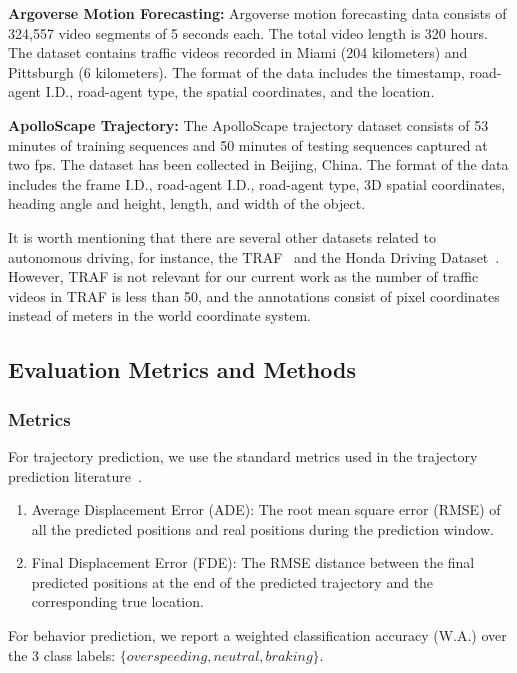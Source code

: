 \documentclass[10pt,twocolumn,letterpaper]{article}
\theoremstyle{plain}
\begin{document}
\noindent \textbf{Argoverse Motion Forecasting: } Argoverse motion forecasting data consists of 324,557 video segments of 5 seconds each. The total video length is 320 hours. The dataset contains traffic videos recorded in Miami (204 kilometers) and Pittsburgh (6 kilometers). The format of the data includes the timestamp, road-agent I.D., road-agent type, the spatial coordinates, and the location.

\noindent \textbf{ApolloScape Trajectory:} The ApolloScape trajectory dataset consists of 53 minutes of training sequences and 50 minutes of testing sequences captured at two fps. The dataset has been collected in Beijing, China. The format of the data includes the frame I.D., road-agent I.D., road-agent type, 3D spatial coordinates, heading angle and height, length, and width of the object.

It is worth mentioning that there are several other datasets related to autonomous driving, for instance, the TRAF~\cite{traphic} and the Honda Driving Dataset~\cite{honda}. However, TRAF is not relevant for our current work as the number of traffic videos in TRAF is less than 50, and the annotations consist of pixel coordinates instead of meters in the world coordinate system. 
\subsection{Evaluation Metrics and Methods}
\label{subsec: eval_metrics_methods}
\subsubsection{Metrics}
For trajectory prediction, we use the standard metrics used in the trajectory prediction literature~\cite{social-lstm,social-gan,traphic,nachiket,chandra2019robusttp}.
\begin{enumerate}[noitemsep]
    \item Average Displacement Error (ADE): The root mean square error (RMSE) of all the predicted positions and real positions during the prediction window.
    \item Final Displacement Error (FDE): The RMSE distance between the final predicted positions at the end of the predicted trajectory and the corresponding true location.
\end{enumerate}

For behavior prediction, we report a weighted classification accuracy (W.A.) over the 3 class labels: $\{ overspeeding, neutral, braking\}$. 
\vspace{-5pt}
\end{document}
